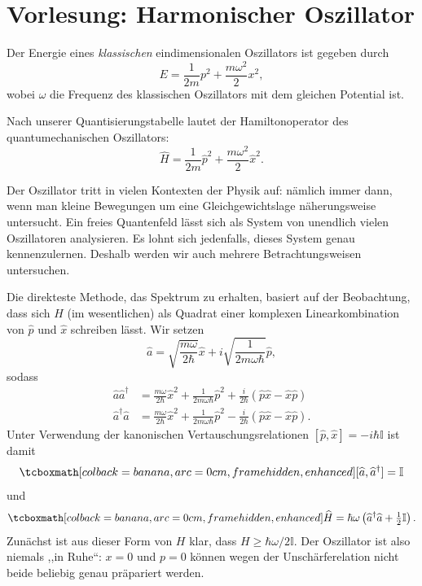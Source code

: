 
\section{Vorlesung: Harmonischer Oszillator}
Der Energie eines \emph{klassischen} eindimensionalen Oszillators ist gegeben durch
\begin{equation}
	E = \frac{1}{2m}p^2 + \frac{m\omega^2}{2}x^2,
\end{equation}
wobei $\omega$ die Frequenz des klassischen Oszillators mit dem gleichen Potential
ist.

Nach unserer Quantisierungstabelle lautet der Hamiltonoperator des quantumechanischen Oszillators:
\begin{equation}
	\widehat{H} = \frac{1}{2m}\widehat{p}^2 + \frac{m\omega^2}{2}\widehat{x}^2.
\end{equation}	


Der Oszillator tritt in vielen Kontexten der Physik auf: nämlich immer dann, wenn man kleine Bewegungen um eine Gleichgewichtslage näherungsweise untersucht. Ein freies Quantenfeld lässt sich als System von unendlich
vielen Oszillatoren analysieren. Es lohnt sich jedenfalls, dieses System genau kennenzulernen. Deshalb werden wir auch mehrere Betrachtungsweisen untersuchen.

Die direkteste Methode, das Spektrum zu erhalten, basiert auf der Beobachtung, dass sich $H$ (im wesentlichen) als Quadrat einer komplexen Linearkombination von $\widehat{p}$ und $\widehat{x}$ schreiben lässt. Wir setzen
\begin{equation}
	\widehat{a} = \sqrt{\frac{m\omega}{2\hbar}}\widehat{x} + i \sqrt{\frac{1}{2m\omega\hbar}}\widehat{p},
\end{equation}
sodass
\begin{align}
	\widehat{a} \widehat{a}^\dag &= \frac{m\omega}{2\hbar}\widehat{x}^2 + \frac{1}{2m\omega\hbar}\widehat{p}^2 + \frac{i}{2\hbar} (\widehat{p}\widehat{x} - \widehat{x}\widehat{p}) \\
	\widehat{a}^\dag \widehat{a} &= \frac{m\omega}{2\hbar}\widehat{x}^2 + \frac{1}{2m\omega\hbar}\widehat{p}^2 - \frac{i}{2\hbar} (\widehat{p}\widehat{x} - \widehat{x}\widehat{p}).
\end{align}
Unter Verwendung der kanonischen Vertauschungsrelationen $[\widehat{p},\widehat{x}] = -i\hbar\mathbb{I}$ ist damit
\begin{equation}\label{eq:ccra}
	\eqbox{ [\widehat{a}, \widehat{a}^\dag] = \mathbb{I}}
\end{equation}
und
\begin{equation}\label{eq:qho}
	\eqbox{\widehat{H} = \hbar \omega \left(\widehat{a}^\dag \widehat{a} + \tfrac{1}{2}\mathbb{I}\right).}
\end{equation}
Zunächst ist aus dieser Form von $H$ klar, dass $H \ge \hbar\omega/2 \mathbb{I}$. Der Oszillator ist
also niemals ,,in Ruhe``: $x=0$ und $p = 0$ können wegen der Unschärferelation nicht beide beliebig genau präpariert werden. 

